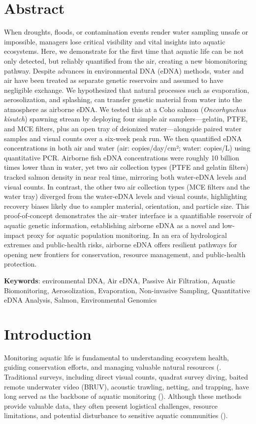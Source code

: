 \documentclass{article}
\begin{document}
\section*{Abstract}
When droughts, floods, or contamination events render water sampling unsafe or impossible, managers lose critical visibility and vital insights into aquatic ecosystems. Here, we demonstrate for the first time that aquatic life can be not only detected, but reliably quantified from the air, creating a new biomonitoring pathway. Despite advances in environmental DNA (eDNA) methods, water and air have been treated as separate genetic reservoirs and assumed to have negligible exchange. We hypothesized that natural processes such as evaporation, aerosolization, and splashing, can transfer genetic material from water into the atmosphere as airborne eDNA. We tested this at a Coho salmon (\textit{Oncorhynchus kisutch}) spawning stream by deploying four simple air samplers—gelatin, PTFE, and MCE filters, plus an open tray of deionized water—alongside paired water samples and visual counts over a six-week peak run. We then quantified eDNA concentrations in both air and water  (air: copies/day/cm²; water: copies/L) using quantitative PCR. Airborne fish eDNA concentrations were roughly 10 billion times lower than in water, yet two air collection types (PTFE and gelatin filters) tracked salmon density in near real time, mirroring both water-eDNA levels and visual counts. In contrast, the other two air collection types (MCE filters and the water tray) diverged from the water-eDNA levels and visual counts, highlighting recovery biases likely due to sampler material, orientation, and particle size. This proof-of-concept demonstrates the air–water interface is a quantifiable reservoir of aquatic genetic information, establishing airborne eDNA as a novel and low-impact proxy for aquatic population monitoring. In an era of hydrological extremes and public-health risks, airborne eDNA offers resilient pathways for opening new frontiers for conservation, resource management, and public-health protection.

\textbf{Keywords}: environmental DNA, Air eDNA, Passive Air Filtration, Aquatic Biomonitoring, Aerosolization, Evaporation, Non-invasive Sampling, Quantitative eDNA Analysis, Salmon, Environmental Genomics

\section{Introduction}
Monitoring aquatic life is fundamental to understanding ecosystem health, guiding conservation efforts, and managing valuable natural resources (\cite{dudgeon2006,reid2019}. Traditional surveys, including direct visual counts, quadrat survey diving, baited remote underwater video (BRUV), acoustic trawling, netting, and trapping, have long served as the backbone of aquatic monitoring (\cite{guri2024a}). Although these methods provide valuable data, they often present logistical challenges, resource limitations, and potential disturbance to sensitive aquatic communities (\cite{guri2024a}).
\end{document}
